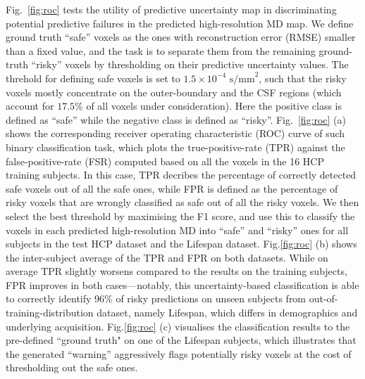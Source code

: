 Fig.~\ref{fig:roc} tests the utility of predictive uncertainty map in discriminating potential predictive failures in the predicted high-resolution MD map. We define ground truth ``safe'' voxels as the ones with reconstruction error (RMSE) smaller than a fixed value, and the task is to separate them from the remaining ground-truth ``risky'' voxels  by thresholding on their predictive uncertainty values. The threhold for defining safe voxels is set to $1.5\times10^{-4} \text{ s/mm}^2$, such that the risky voxels mostly concentrate on the outer-boundary and the CSF regions (which account for $17.5\%$ of all voxels under consideration). Here the positive class is defined as ``safe'' while  the negative class is defined as ``risky''. Fig.~\ref{fig:roc} (a) shows the corresponding receiver operating characteristic (ROC) curve of such binary classification task, which plots the true-positive-rate (TPR) against the false-positive-rate (FSR) computed based on all the voxels in the 16 HCP training subjects. In this case, TPR decribes the percentage of correctly detected safe voxels out of all the safe ones, while FPR is defined as the percentage of risky voxels that are wrongly classified as safe out of all the risky voxels. We then select the best threshold by maximising the F1 score, and use this to classify the voxels in each predicted high-resolution MD into ``safe'' and ``risky'' ones for all subjects in the test HCP dataset and the Lifespan dataset. Fig.\ref{fig:roc} (b) shows the inter-subject average of the TPR and FPR on both datasets. While on average TPR slightly worsens compared to the results on the training subjects, FPR improves in both cases---notably, this uncertainty-based classification is able to correctly identify 96\% of risky predictions on unseen subjects from out-of-training-distribution dataset, namely Lifespan, which differs in demographics and underlying acquisition. Fig.\ref{fig:roc} (c) visualises the classification results to the pre-defined ``ground truth" on one of the Lifespan subjects, which illustrates that the generated ``warning'' aggressively flags potentially risky voxels at the cost of thresholding out the safe ones. 

